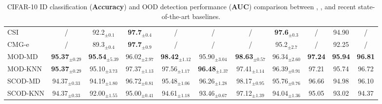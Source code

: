 \begin{table}[h!]
{\begin{tabular}{|l|c|cccccc|ccc|}
CSI  & / & 92.2$_{\pm 0.1}$     & \textbf{97.7}$_{\pm 0.4}$  & /  & /   & /   & \multicolumn{1}{c|}{\textbf{97.6}$_{\pm 0.3}$} & / & 94.90 &  /  \\  
CMG-e   & /   & 89.3$_{\pm 0.4}$   & \textbf{97.7}$_{\pm 0.9}$  & / & /  & / & \multicolumn{1}{c|}{95.2$_{\pm 2.7}$}  & / & 92.25 &    /      \\  \hline
MOD-MD  & \textbf{95.37}$_{\pm 0.29}$ & \textbf{95.54}$_{\pm 5.39}$ & 96.02$_{\pm 2.97}$ & \textbf{98.42}$_{\pm 1.12}$ & 95.90$_{\pm 3.04}$ & \textbf{98.63}$_{\pm 0.57}$ & \multicolumn{1}{c|}{96.34$_{\pm 2.60}$}  & \textbf{97.24} & \textbf{95.94}  & \textbf{96.81}   \\ %
MOD-KNN  & \textbf{95.37}$_{\pm 0.29}$ & 95.10$_{\pm 3.73}$ & 97.37$_{\pm 1.13}$ & 97.56$_{\pm 1.17}$ & \textbf{96.48}$_{\pm 1.37}$ & 97.41$_{\pm 1.14}$ & \multicolumn{1}{c|}{96.39$_{\pm 0.91}$} & 97.21 & 95.74  &  96.72  \\ \hline
SCOD-MD  & 94.37$_{\pm 0.33}$ &  94.19$_{\pm 1.80}$ & 96.72$_{\pm 0.81}$ & 95.48$_{\pm 1.06}$ & 96.26$_{\pm 1.28}$ & 98.17$_{\pm 0.95}$ & 95.76$_{\pm 0.76}$  & 96.66 & 94.98 &  96.10     \\ 
SCOD-KNN  & 94.37$_{\pm 0.33}$ & 92.00$_{\pm 1.55}$ & 95.00$_{\pm 0.41}$ & 94.61$_{\pm 1.18}$ & 93.46$_{\pm 0.67}$ & 97.12$_{\pm 1.39}$ & 94.04$_{\pm 1.36}$ & 95.05 & 93.02 &  94.37   \\ \hline
\end{tabular}
}
\caption{CIFAR-10 ID classification (\textbf{Accuracy}) and OOD detection performance (\textbf{AUC}) comparison between \sysc, \sysa, and recent state-of-the-art baselines. %
}
\label{tab:propwork-scod-results-cifar10}
\end{table}

